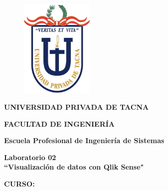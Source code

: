\documentclass[12pt,letterpaper]{article}
\begin{document}
    \begin{titlepage}
        \begin{center}
            \begin{figure}[htb]
                \begin{center}
                    \includegraphics[width=3.5cm]{./img/logo}
                \end{center}
            \end{figure}
            \vspace*{0.15in}
            \begin{Large}
                \textbf{UNIVERSIDAD PRIVADA DE TACNA}\\
            \end{Large}
            \vspace*{0.15in}
            \begin{Large}
                \textbf{FACULTAD DE INGENIERÍA} \\
            \end{Large}
            \vspace*{0.1in}
            \begin{Large}
                \textbf{Escuela Profesional de Ingeniería de Sistemas} \\
            \end{Large}
            \vspace*{0.3in}
            \begin{Large}
                \textbf{Laboratorio 02}\\
                \textbf{``Visualización de datos con Qlik Sense"}\\
            \end{Large}
            \vspace*{0.2in}
            \begin{Large}
                \textbf{CURSO:} \\
            \end{Large}
            \vspace*{0.1in}
            \begin{large}

\end{large}
\end{center}
\end{titlepage}
\end{document}
